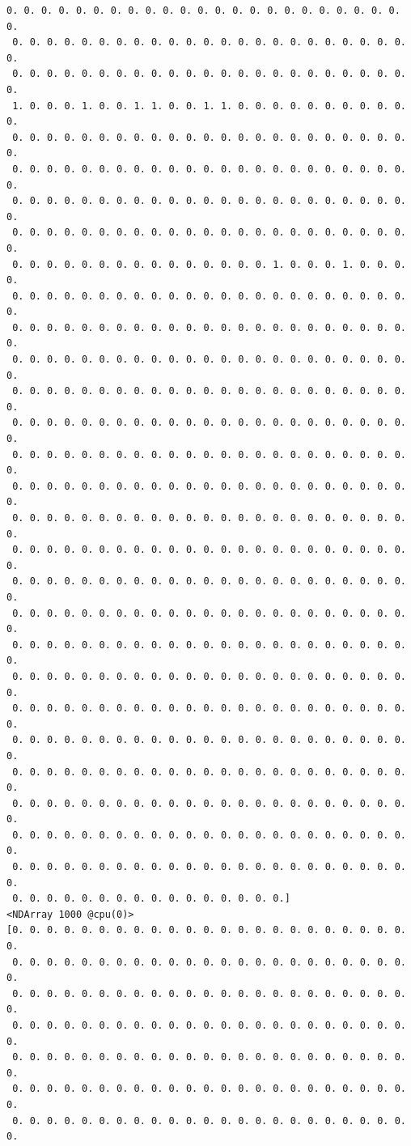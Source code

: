 \documentclass[11pt]{article}
\begin{document}
\begin{Verbatim}[commandchars=\\\{\}]
 0. 0. 0. 0. 0. 0. 0. 0. 0. 0. 0. 0. 0. 0. 0. 0. 0. 0. 0. 0. 0. 0. 0. 0.
 0. 0. 0. 0. 0. 0. 0. 0. 0. 0. 0. 0. 0. 0. 0. 0. 0. 0. 0. 0. 0. 0. 0. 0.
 0. 0. 0. 0. 0. 0. 0. 0. 0. 0. 0. 0. 0. 0. 0. 0. 0. 0. 0. 0. 0. 0. 0. 0.
 1. 0. 0. 0. 1. 0. 0. 1. 1. 0. 0. 1. 1. 0. 0. 0. 0. 0. 0. 0. 0. 0. 0. 0.
 0. 0. 0. 0. 0. 0. 0. 0. 0. 0. 0. 0. 0. 0. 0. 0. 0. 0. 0. 0. 0. 0. 0. 0.
 0. 0. 0. 0. 0. 0. 0. 0. 0. 0. 0. 0. 0. 0. 0. 0. 0. 0. 0. 0. 0. 0. 0. 0.
 0. 0. 0. 0. 0. 0. 0. 0. 0. 0. 0. 0. 0. 0. 0. 0. 0. 0. 0. 0. 0. 0. 0. 0.
 0. 0. 0. 0. 0. 0. 0. 0. 0. 0. 0. 0. 0. 0. 0. 0. 0. 0. 0. 0. 0. 0. 0. 0.
 0. 0. 0. 0. 0. 0. 0. 0. 0. 0. 0. 0. 0. 0. 0. 1. 0. 0. 0. 1. 0. 0. 0. 0.
 0. 0. 0. 0. 0. 0. 0. 0. 0. 0. 0. 0. 0. 0. 0. 0. 0. 0. 0. 0. 0. 0. 0. 0.
 0. 0. 0. 0. 0. 0. 0. 0. 0. 0. 0. 0. 0. 0. 0. 0. 0. 0. 0. 0. 0. 0. 0. 0.
 0. 0. 0. 0. 0. 0. 0. 0. 0. 0. 0. 0. 0. 0. 0. 0. 0. 0. 0. 0. 0. 0. 0. 0.
 0. 0. 0. 0. 0. 0. 0. 0. 0. 0. 0. 0. 0. 0. 0. 0. 0. 0. 0. 0. 0. 0. 0. 0.
 0. 0. 0. 0. 0. 0. 0. 0. 0. 0. 0. 0. 0. 0. 0. 0. 0. 0. 0. 0. 0. 0. 0. 0.
 0. 0. 0. 0. 0. 0. 0. 0. 0. 0. 0. 0. 0. 0. 0. 0. 0. 0. 0. 0. 0. 0. 0. 0.
 0. 0. 0. 0. 0. 0. 0. 0. 0. 0. 0. 0. 0. 0. 0. 0. 0. 0. 0. 0. 0. 0. 0. 0.
 0. 0. 0. 0. 0. 0. 0. 0. 0. 0. 0. 0. 0. 0. 0. 0. 0. 0. 0. 0. 0. 0. 0. 0.
 0. 0. 0. 0. 0. 0. 0. 0. 0. 0. 0. 0. 0. 0. 0. 0. 0. 0. 0. 0. 0. 0. 0. 0.
 0. 0. 0. 0. 0. 0. 0. 0. 0. 0. 0. 0. 0. 0. 0. 0. 0. 0. 0. 0. 0. 0. 0. 0.
 0. 0. 0. 0. 0. 0. 0. 0. 0. 0. 0. 0. 0. 0. 0. 0. 0. 0. 0. 0. 0. 0. 0. 0.
 0. 0. 0. 0. 0. 0. 0. 0. 0. 0. 0. 0. 0. 0. 0. 0. 0. 0. 0. 0. 0. 0. 0. 0.
 0. 0. 0. 0. 0. 0. 0. 0. 0. 0. 0. 0. 0. 0. 0. 0. 0. 0. 0. 0. 0. 0. 0. 0.
 0. 0. 0. 0. 0. 0. 0. 0. 0. 0. 0. 0. 0. 0. 0. 0. 0. 0. 0. 0. 0. 0. 0. 0.
 0. 0. 0. 0. 0. 0. 0. 0. 0. 0. 0. 0. 0. 0. 0. 0. 0. 0. 0. 0. 0. 0. 0. 0.
 0. 0. 0. 0. 0. 0. 0. 0. 0. 0. 0. 0. 0. 0. 0. 0. 0. 0. 0. 0. 0. 0. 0. 0.
 0. 0. 0. 0. 0. 0. 0. 0. 0. 0. 0. 0. 0. 0. 0. 0. 0. 0. 0. 0. 0. 0. 0. 0.
 0. 0. 0. 0. 0. 0. 0. 0. 0. 0. 0. 0. 0. 0. 0. 0. 0. 0. 0. 0. 0. 0. 0. 0.
 0. 0. 0. 0. 0. 0. 0. 0. 0. 0. 0. 0. 0. 0. 0. 0. 0. 0. 0. 0. 0. 0. 0. 0.
 0. 0. 0. 0. 0. 0. 0. 0. 0. 0. 0. 0. 0. 0. 0. 0.]
<NDArray 1000 @cpu(0)> 
[0. 0. 0. 0. 0. 0. 0. 0. 0. 0. 0. 0. 0. 0. 0. 0. 0. 0. 0. 0. 0. 0. 0. 0.
 0. 0. 0. 0. 0. 0. 0. 0. 0. 0. 0. 0. 0. 0. 0. 0. 0. 0. 0. 0. 0. 0. 0. 0.
 0. 0. 0. 0. 0. 0. 0. 0. 0. 0. 0. 0. 0. 0. 0. 0. 0. 0. 0. 0. 0. 0. 0. 0.
 0. 0. 0. 0. 0. 0. 0. 0. 0. 0. 0. 0. 0. 0. 0. 0. 0. 0. 0. 0. 0. 0. 0. 0.
 0. 0. 0. 0. 0. 0. 0. 0. 0. 0. 0. 0. 0. 0. 0. 0. 0. 0. 0. 0. 0. 0. 0. 0.
 0. 0. 0. 0. 0. 0. 0. 0. 0. 0. 0. 0. 0. 0. 0. 0. 0. 0. 0. 0. 0. 0. 0. 0.
 0. 0. 0. 0. 0. 0. 0. 0. 0. 0. 0. 0. 0. 0. 0. 0. 0. 0. 0. 0. 0. 0. 0. 0.

\end{Verbatim}
\end{document}
